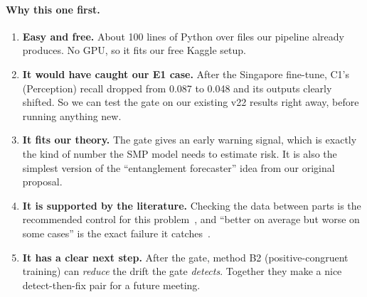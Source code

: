 \documentclass[11pt,a4paper]{article}
\begin{document}
\paragraph{Why this one first.}
\begin{enumerate}[noitemsep]
    \item \textbf{Easy and free.} About 100 lines of Python over files our
          pipeline already produces. No GPU, so it fits our free Kaggle
          setup.
    \item \textbf{It would have caught our E1 case.} After the Singapore
          fine-tune, C1's (Perception) recall dropped from 0.087 to
          0.048 and its outputs clearly shifted. So we can test the gate on our
          existing v22 results right away, before running anything new.
    \item \textbf{It fits our theory.} The gate gives an early warning
          signal, which is exactly the kind of number the SMP model needs
          to estimate risk. It is also the simplest version of the
          ``entanglement forecaster'' idea from our original proposal.
    \item \textbf{It is supported by the literature.} Checking the data
          between parts is the recommended control for this
          problem~\cite{sculley2015hidden,breck2019data}, and ``better on
          average but worse on some cases'' is the exact failure it
          catches~\cite{yan2021pctraining}.
    \item \textbf{It has a clear next step.} After the gate, method B2
          (positive-congruent training) can \emph{reduce} the drift the
          gate \emph{detects}. Together they make a nice detect-then-fix
          pair for a future meeting.
\end{enumerate}
\end{document}
